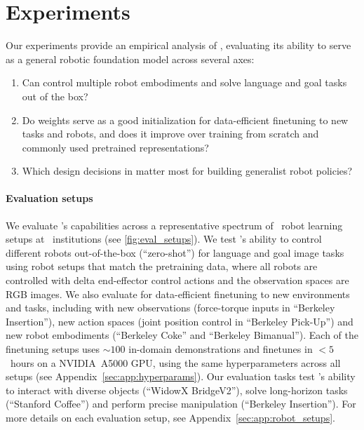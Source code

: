 \section{Experiments}
\label{sec:experiments}

Our experiments provide an empirical analysis of \method{}, evaluating its ability to serve as a general robotic foundation model across several axes:
\begin{enumerate}
    \item Can \method{} control multiple robot embodiments and solve language and goal tasks out of the box?
    \item Do \method{} weights serve as a good initialization for data-efficient finetuning to new tasks and robots, and does it improve over training from scratch and commonly used pretrained representations?

    \item Which design decisions in \method{} matter most for building generalist robot policies?
\end{enumerate}

\paragraph{Evaluation setups} We evaluate \method's capabilities across a representative spectrum of \nsetups{}~robot learning setups at \ninstitutions{}~institutions (see \cref{fig:eval_setups}).
We test \method's ability to control different robots out-of-the-box (``zero-shot'') for language and goal image tasks using robot setups that match the pretraining data, where all robots are controlled with delta end-effector control actions and the observation spaces are RGB images. We also evaluate \method{} for data-efficient finetuning to new environments and tasks, including with new observations (force-torque inputs in ``Berkeley Insertion''),  new action spaces (joint position control in ``Berkeley Pick-Up'') and new robot embodiments (``Berkeley Coke'' and ``Berkeley Bimanual'').
Each of the finetuning setups uses $\sim100$ in-domain demonstrations and finetunes in $<5$~hours on a NVIDIA~A5000 GPU, using the same hyperparameters across all setups (see Appendix~\ref{sec:app:hyperparams}). Our evaluation tasks test \method's ability to interact with diverse objects (\eg ``WidowX BridgeV2''), solve long-horizon tasks (\eg ``Stanford Coffee'') and perform precise manipulation (\eg ``Berkeley Insertion''). For more details on each evaluation setup, see Appendix~\ref{sec:app:robot_setups}.




